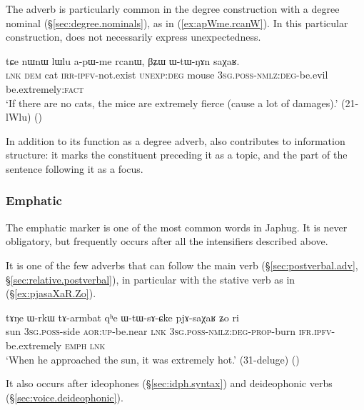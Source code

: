 The adverb  is particularly common in the degree construction with a  degree nominal (§\ref{sec:degree.nominals}), as in (\ref{ex:apWme.rcanW}). In this particular construction,   does not necessarily express unexpectedness.

\begin{exe}
	\ex \label{ex:apWme.rcanW}
	\gll  tɕe nɯnɯ lɯlu a-pɯ-me rcanɯ, βʑɯ ɯ-tɯ-ŋɤn saχaʁ. \\
	\textsc{lnk} \textsc{dem} cat \textsc{irr}-\textsc{ipfv}-not.exist \textsc{unexp}:\textsc{deg} mouse
	\textsc{3sg}.\textsc{poss}-\textsc{nmlz}:\textsc{deg}-be.evil be.extremely:\textsc{fact} \\ 
	\glt `If there are no cats, the mice are extremely fierce (cause a lot of damages).' (21-lWlu) 
()
\end{exe}

In addition to its function as a degree adverb,   also contributes to information structure: it marks the constituent preceding it as a topic, and the part of the sentence following it as a focus.
 
\subsubsection{Emphatic} \label{sec:emphatic.Zo} 
The emphatic marker  is one of the most common words in Japhug. It is never obligatory, but frequently occurs after all the intensifiers described above. 

It is one of the few adverbs that can follow the main verb (§\ref{sec:postverbal.adv}, §\ref{sec:relative.postverbal}), in particular with the stative verb  as in (§\ref{ex:pjasaXaR.Zo}).

\begin{exe}
	\ex \label{ex:pjasaXaR.Zo}
	\gll tɤŋe ɯ-rkɯ tɤ-armbat qʰe ɯ-tɯ-sɤ-ɕke pjɤ-saχaʁ ʑo ri \\
	sun \textsc{3sg}.\textsc{poss}-side \textsc{aor}:\textsc{up}-be.near \textsc{lnk} \textsc{3sg}.\textsc{poss}-\textsc{nmlz}:\textsc{deg}-\textsc{prop}-burn \textsc{ifr}.\textsc{ipfv}-be.extremely \textsc{emph} \textsc{lnk} \\
	\glt `When he approached the sun, it was extremely hot.' (31-deluge)
()
	\end{exe}
	
It also occurs after ideophones (§\ref{sec:idph.syntax}) and deideophonic verbs (§\ref{sec:voice.deideophonic}).

